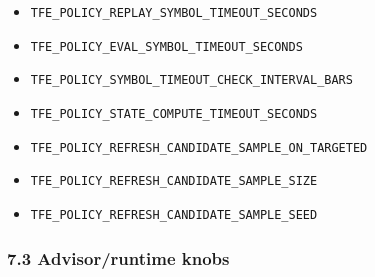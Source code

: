 \documentclass[
]{article}
\providecommand{\tightlist}{%
  \setlength{\itemsep}{0pt}\setlength{\parskip}{0pt}}
\begin{document}
\begin{itemize}
  \begin{itemize}
  \tightlist
  \item
    \texttt{TFE\_POLICY\_REPLAY\_SYMBOL\_TIMEOUT\_SECONDS}
  \item
    \texttt{TFE\_POLICY\_EVAL\_SYMBOL\_TIMEOUT\_SECONDS}
  \item
    \texttt{TFE\_POLICY\_SYMBOL\_TIMEOUT\_CHECK\_INTERVAL\_BARS}
  \item
    \texttt{TFE\_POLICY\_STATE\_COMPUTE\_TIMEOUT\_SECONDS}
  \item
    \texttt{TFE\_POLICY\_REFRESH\_CANDIDATE\_SAMPLE\_ON\_TARGETED}
  \item
    \texttt{TFE\_POLICY\_REFRESH\_CANDIDATE\_SAMPLE\_SIZE}
  \item
    \texttt{TFE\_POLICY\_REFRESH\_CANDIDATE\_SAMPLE\_SEED}
  \end{itemize}
\end{itemize}

\subsubsection{7.3 Advisor/runtime knobs}\label{73-advisorruntime-knobs}
\end{document}
